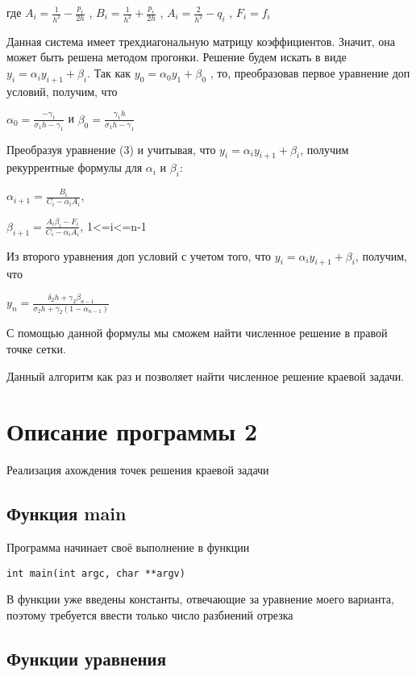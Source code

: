 \documentclass[a4paper,12pt,titlepage,finall]{article}
\begin{document}
где $A_i = \frac{1}{h^2} - \frac{p_i}{2h}$ , 
 $B_i = \frac{1}{h^2} + \frac{p_i}{2h}$ , 
  $A_i = \frac{2}{h^2} - q_i$ , 
  $F_i = f_i$
  
Данная система имеет трехдиагональную матрицу коэффициентов. Значит, она может быть решена методом прогонки. Решение будем искать в виде $y_i = {\alpha}_i y_{i+1} + {\beta}_i$. Так как $y_0 = {\alpha}_0 y_1 + {\beta}_0$ , то, преобразовав первое уравнение доп условий, получим, что 

${\alpha}_0 = \frac{-{\gamma}_1}{{\sigma}_1 h - {\gamma}_1}$
и ${\beta}_0 = \frac{{\gamma}_1 h}{{\sigma}_1 h - {\gamma}_1}$

Преобразуя уравнение (3) и учитывая, что $y_i = {\alpha}_i y_{i+1} + {\beta}_i$, получим рекуррентные формулы для ${\alpha}_i$ и ${\beta}_i$:

${\alpha}_{i+1} = \frac{B_i}{C_i - {\alpha}_i A_i}$,


${\beta}_{i+1} = \frac{A_i {\beta}_i - F_i}{C_i - {\alpha}_i A_i}$, 1<=i<=n-1

Из второго уравнения доп условий с учетом того, что $y_i = {\alpha}_i y_{i+1} + {\beta}_i$, получим, что 

$y_n = \frac{{\delta}_2 h + {\gamma}_2 {\beta}_{n-1}}{{\sigma}_2 h + {\gamma}_2 (1-{\alpha}_{n-1})}$

С помощью данной формулы мы сможем найти численное решение в правой точке сетки.

Данный алгоритм как раз и позволяет найти численное решение краевой задачи.

\newpage
\section{Описание программы 2}
Реализация ахождения точек решения краевой задачи

\subsection{Функция main}
Программа начинает своё выполнение в функции
\begin{verbatim}
int main(int argc, char **argv)
\end{verbatim}

В функции уже введены константы, отвечающие за уравнение моего варианта, поэтому требуется ввести только число разбиений отрезка


\subsection{Функции уравнения}
\end{document}
